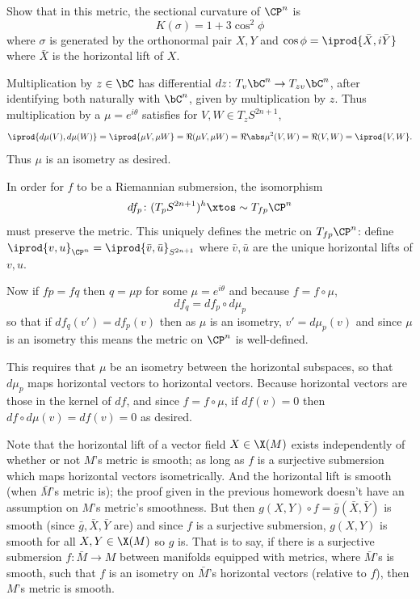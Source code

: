         \item Show that in this metric, the sectional curvature of $\CP^n$ is
        $$ K(\sigma) = 1 + 3\cos^2\phi $$
        where $\sigma$ is generated by the orthonormal pair $X,Y$ and $\cos\phi=\iprod{\bar X,i\bar Y}$ where $\bar X$
        is the horizontal lift of $X$.
    \eenum

\eprob

\benum
    \item Multiplication by $z\in\bC$ has differential $dz\colon T_v\bC^n\to T_{zv}\bC^n$, after identifying both naturally with
    $\bC^n$, given by multiplication by $z$.
    Thus multiplication by a $\mu=e^{i\theta}$ satisfies for $V,W\in T_zS^{2n+1}$,
    $$ \iprod{d\mu(V),d\mu(W)} = \iprod{\mu V,\mu W} = \Re(\mu V,\mu W) = \Re\abs\mu^2(V,W) = \Re(V,W) = \iprod{V,W} . $$
    Thus $\mu$ is an isometry as desired.

    In order for $f$ to be a Riemannian submersion, the isomorphism
    $$ df_p\colon(T_pS^{2n+1})^h \xtos\sim T_{fp}\CP^n $$
    must preserve the metric.
    This uniquely defines the metric on $T_{fp}\CP^n$: define $\iprod{v,u}_{\CP^n}=\iprod{\bar v,\bar u}_{S^{2n+1}}$ where
    $\bar v,\bar u$ are the unique horizontal lifts of $v,u$.

    Now if $fp=fq$ then $q=\mu p$ for some $\mu=e^{i\theta}$ and because $f=f\circ\mu$,
    $$ df_q = df_p\circ d\mu_p $$
    so that if $df_q(v')=df_p(v)$ then as $\mu$ is an isometry, $v'=d\mu_p(v)$ and since $\mu$ is an isometry this means
    the metric on $\CP^n$ is well-defined.

    This requires that $\mu$ be an isometry between the horizontal subspaces, so that $d\mu_p$ maps horizontal vectors to
    horizontal vectors.
    Because horizontal vectors are those in the kernel of $df$, and since $f=f\circ\mu$, if $df(v)=0$ then
    $df\circ d\mu(v)=df(v)=0$ as desired.

    Note that the horizontal lift of a vector field $X\in\X(M)$ exists independently of whether or not $M$'s metric is smooth; as long as $f$ is a surjective submersion
    which maps horizontal vectors isometrically.
    And the horizontal lift is smooth (when $\bar M$'s metric is); the proof given in the previous homework doesn't have an assumption on $M$'s metric's smoothness.
    But then $g(X,Y)\circ f=\bar g(\bar X,\bar Y)$ is smooth (since $\bar g,\bar X,\bar Y$ are) and since $f$ is a surjective submersion, $g(X,Y)$ is smooth for all $X,Y\in\X(M)$
    so $g$ is.
    That is to say, if there is a surjective submersion $f\colon\bar M\to M$ between manifolds equipped with metrics, where $\bar M$'s is smooth, such that $f$ is an isometry on
    $\bar M$'s horizontal vectors (relative to $f$), then $M$'s metric is smooth.

